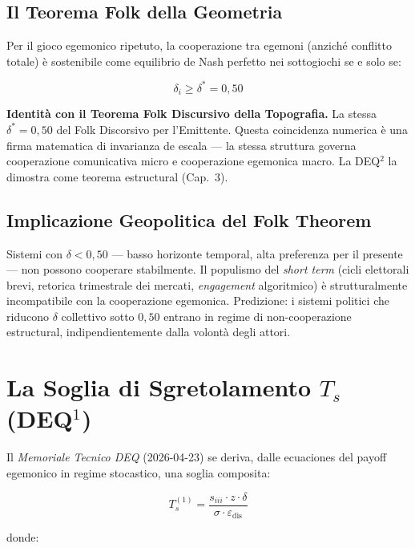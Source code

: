 \subsection{Il Teorema Folk della
Geometria}\label{il-folk-theorem-della-geometria}

\Proved{} Per il gioco egemonico ripetuto, la cooperazione tra egemoni
(anziché conflitto totale) è sostenibile come equilibrio de Nash
perfetto nei sottogiochi se e solo se:

\[
\delta_i \geq \delta^* = 0{,}50
\]

\Hypoth{} \textbf{Identità con il Teorema Folk Discursivo della
Topografia.} La stessa \(\delta^* = 0{,}50\) del Folk Discorsivo per
l'Emittente. Questa coincidenza numerica è una firma matematica di
invarianza de escala --- la stessa struttura governa cooperazione
comunicativa micro e cooperazione egemonica macro. La DEQ$^2$ la dimostra
come teorema estructural (Cap.~3).

\subsection{Implicazione Geopolitica del Folk
Theorem}\label{implicazione-geopolitica-del-folk-theorem}

\Hypoth{} Sistemi con \(\delta < 0{,}50\) --- basso horizonte temporal,
alta preferenza per il presente --- non possono cooperare stabilmente.
Il populismo del \emph{short term} (cicli elettorali brevi, retorica
trimestrale dei mercati, \emph{engagement} algoritmico) è
strutturalmente incompatibile con la cooperazione egemonica. Predizione:
i sistemi politici che riducono \(\delta\) collettivo sotto \(0{,}50\)
entrano in regime di non-cooperazione estructural, indipendientemente
dalla volontà degli attori.



\section{\texorpdfstring{La Soglia di Sgretolamento \(T_s\)
(DEQ$^1$)}{La Soglia di Sgretolamento T\_s (DEQ$^1$)}}\label{la-soglia-di-sgretolamento-t_s-dequxb9}

Il \emph{Memoriale Tecnico DEQ} (2026-04-23) se deriva, dalle ecuaciones del
payoff egemonico in regime stocastico, una soglia composita:

\[
T_s^{(1)} = \frac{s_{iii} \cdot z \cdot \delta}{\sigma \cdot \varepsilon_{\text{dis}}}
\]

donde:

